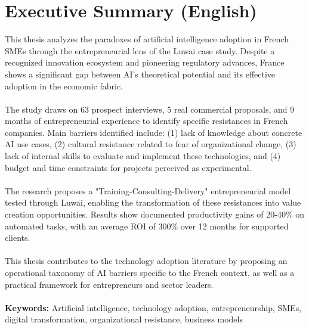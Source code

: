 \newpage
\section*{Executive Summary (English)}

This thesis analyzes the paradoxes of artificial intelligence adoption in French SMEs through the entrepreneurial lens of the Luwai case study. Despite a recognized innovation ecosystem and pioneering regulatory advances, France shows a significant gap between AI's theoretical potential and its effective adoption in the economic fabric.
\\\\
The study draws on 63 prospect interviews, 5 real commercial proposals, and 9 months of entrepreneurial experience to identify specific resistances in French companies. Main barriers identified include: (1) lack of knowledge about concrete AI use cases, (2) cultural resistance related to fear of organizational change, (3) lack of internal skills to evaluate and implement these technologies, and (4) budget and time constraints for projects perceived as experimental.
\\\\
The research proposes a "Training-Consulting-Delivery" entrepreneurial model tested through Luwai, enabling the transformation of these resistances into value creation opportunities. Results show documented productivity gains of 20-40\% on automated tasks, with an average ROI of 300\% over 12 months for supported clients.
\\\\
This thesis contributes to the technology adoption literature by proposing an operational taxonomy of AI barriers specific to the French context, as well as a practical framework for entrepreneurs and sector leaders.
\\\\
\textbf{Keywords:} Artificial intelligence, technology adoption, entrepreneurship, SMEs, digital transformation, organizational resistance, business models
